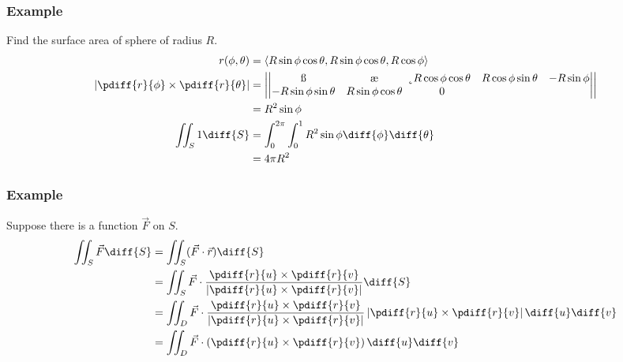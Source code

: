 \documentclass{math}
\begin{document}
\subsubsection*{Example}
Find the surface area of sphere of radius \( R \).
\begin{align*}
  r(\phi,\theta) &= \langle
    R\sin\phi\cos\theta,R\sin\phi\cos\theta,R\cos\phi\rangle \\
  \left|\pdiff{r}{\phi}\times\pdiff{r}{\theta}\right| &= \left|\begin{vmatrix}
    \i & \j & \k \\
    R\cos\phi\cos\theta & R\cos\phi\sin\theta & -R\sin\phi \\
    -R\sin\phi\sin\theta & R\sin\phi\cos\theta & 0
  \end{vmatrix}\right| \\
  &= R^2\sin\phi \\
  \iint_{S}1\diff{S} &= \int_{0}^{2\pi}\int_{0}^{1}
    R^2\sin\phi\diff{\phi}\diff{\theta} \\
  &= 4\pi R^2
\end{align*}

\subsubsection*{Example}
Suppose there is a function \( \vec{F} \) on \( S \).
\begin{align*}
  \iint_{S}\vec{F}\diff{S} &= \iint_{S}(\vec{F}\cdot\vec{r})\diff{S} \\
  &= \iint_{S}\vec{F}\cdot\frac{\pdiff{r}{u}\times\pdiff{r}{v}}
    {\left|\pdiff{r}{u}\times\pdiff{r}{v}\right|}\diff{S} \\
  &= \iint_{D}\vec{F}\cdot\frac{\pdiff{r}{u}\times\pdiff{r}{v}}
    {\left|\pdiff{r}{u}\times\pdiff{r}{v}\right|}
    \left|\pdiff{r}{u}\times\pdiff{r}{v}\right|\diff{u}\diff{v} \\
  &= \iint_{D}\vec{F}\cdot\left(\pdiff{r}{u}\times\pdiff{r}{v}\right)
    \diff{u}\diff{v}
\end{align*}
\end{document}
